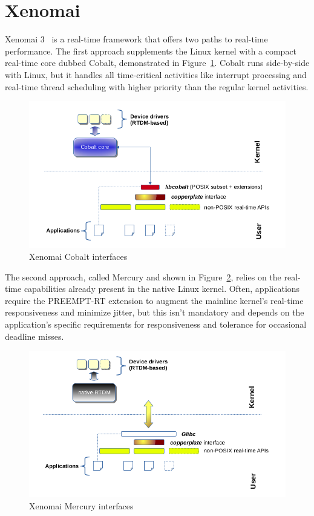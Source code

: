 \documentclass[MMR,Master,english]{twbook}
\begin{document}
\section{Xenomai}
\noindent Xenomai 3~\cite{XenomaiXenomai} is a real-time framework that offers two paths to real-time performance. The first approach supplements the Linux kernel with a compact real-time core dubbed Cobalt, demonstrated in Figure~\ref{fig:cobalt}. Cobalt runs side-by-side with Linux, but it handles all time-critical activities like interrupt processing and real-time thread scheduling with higher priority than the regular kernel activities. 

\begin{figure}[H]
	\centering
	\includegraphics[width=0.5\columnwidth]{img/x3-cobalt-interfaces.png}
	\caption[Xenomai Cobalt interfaces]{Xenomai Cobalt interfaces~\cite{XenomaiXenomai}}
	\label{fig:cobalt}
\end{figure}

\bigskip \noindent  The second approach, called Mercury and shown in Figure~\ref{fig:mercury}, relies on the real-time capabilities already present in the native Linux kernel. Often, applications require the PREEMPT-RT extension to augment the mainline kernel's real-time responsiveness and minimize jitter, but this isn't mandatory and depends on the application's specific requirements for responsiveness and tolerance for occasional deadline misses. 


\begin{figure}[H]
	\centering
	\includegraphics[width=0.5\columnwidth]{img/x3-mercury-interfaces.png}
	\caption[Xenomai Mercury interfaces]{Xenomai Mercury interfaces~\cite{XenomaiXenomai}}
	\label{fig:mercury}
\end{figure}
\end{document}
